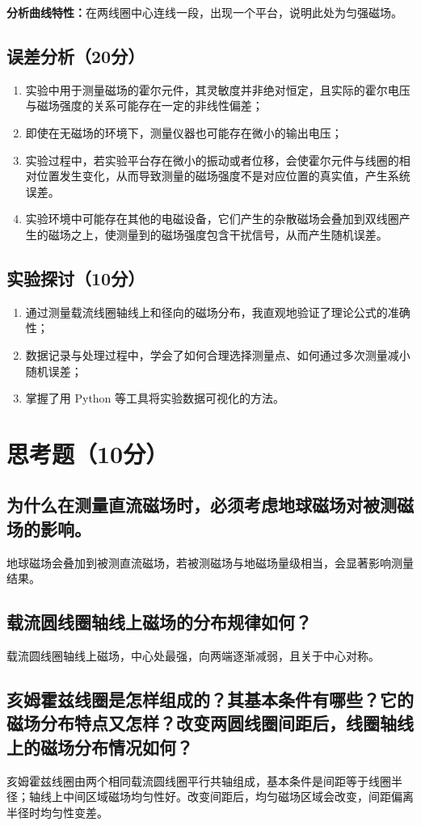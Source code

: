 \documentclass[]{../template/Report}%
\begin{document}
\begin{fullreportonly}
\textbf{分析曲线特性：}在两线圈中心连线一段，出现一个平台，说明此处为匀强磁场。
\subsection{误差分析（20分）}
\begin{enumerate}
    \item 实验中用于测量磁场的霍尔元件，其灵敏度并非绝对恒定，且实际的霍尔电压与磁场强度的关系可能存在一定的非线性偏差；
    \item 即使在无磁场的环境下，测量仪器也可能存在微小的输出电压；
    \item 实验过程中，若实验平台存在微小的振动或者位移，会使霍尔元件与线圈的相对位置发生变化，从而导致测量的磁场强度不是对应位置的真实值，产生系统误差。
    \item 实验环境中可能存在其他的电磁设备，它们产生的杂散磁场会叠加到双线圈产生的磁场之上，使测量到的磁场强度包含干扰信号，从而产生随机误差。
\end{enumerate}

\subsection{实验探讨（10分）}
\begin{enumerate}
    \item 通过测量载流线圈轴线上和径向的磁场分布，我直观地验证了理论公式的准确性；
    \item 数据记录与处理过程中，学会了如何合理选择测量点、如何通过多次测量减小随机误差；
    \item 掌握了用 Python 等工具将实验数据可视化的方法。
\end{enumerate}

\section{思考题（10分）}
\subsection{为什么在测量直流磁场时，必须考虑地球磁场对被测磁场的影响。}
地球磁场会叠加到被测直流磁场，若被测磁场与地磁场量级相当，会显著影响测量结果。
\subsection{载流圆线圈轴线上磁场的分布规律如何？}
载流圆线圈轴线上磁场，中心处最强，向两端逐渐减弱，且关于中心对称。
\subsection{亥姆霍兹线圈是怎样组成的？其基本条件有哪些？它的磁场分布特点又怎样？改变两圆线圈间距后，线圈轴线上的磁场分布情况如何？}
亥姆霍兹线圈由两个相同载流圆线圈平行共轴组成，基本条件是间距等于线圈半径；轴线上中间区域磁场均匀性好。改变间距后，均匀磁场区域会改变，间距偏离半径时均匀性变差。

\end{fullreportonly}
\end{document}

